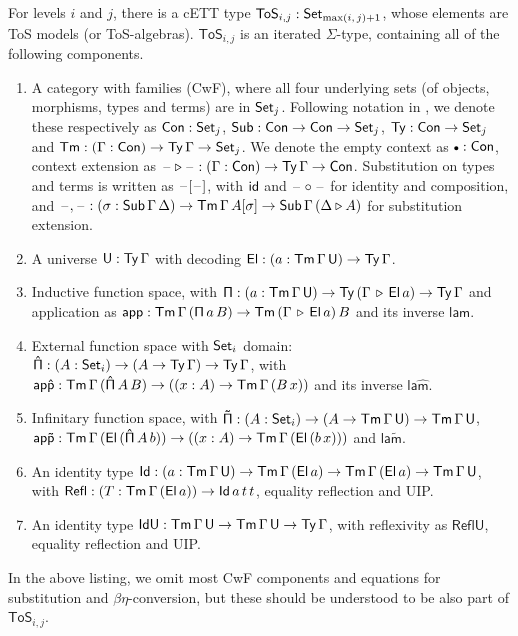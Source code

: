 \documentclass{llncs}
\newcommand{\ToS}{\mathsf{ToS}}
\newcommand{\ext}{\triangleright}
\newcommand{\emptycon}{\scaleobj{.75}\bullet}
\newcommand{\Pii}{\mathsf{\Pi}}
\newcommand{\appi}{\mathsf{app}}
\newcommand{\lami}{\mathsf{lam}}
\newcommand{\Pie}{\mathsf{\hat{\Pi}}}
\newcommand{\appe}{\mathsf{ap\hat{p}}}
\newcommand{\lame}{\mathsf{la\hat{m}}}
\newcommand{\Piinf}{\mathsf{\tilde{\Pi}}}
\newcommand{\appinf}{\mathsf{ap\tilde{p}}}
\newcommand{\laminf}{\mathsf{la\tilde{m}}}
\newcommand{\Refl}{\mathsf{Refl}}
\newcommand{\IdU}{\mathsf{IdU}}
\newcommand{\ReflU}{\mathsf{ReflU}}
\begin{document}
\begin{nidefinition}\label{def:tos}
For levels $i$ and $j$, there is a cETT type $\ToS_{i,j} : \Set_{\max(i,\,j)+1}$, whose elements are
ToS models (or ToS-algebras). $\ToS_{i,j}$ is an iterated $\Sigma$-type, containing
all of the following components.
\begin{enumerate}
\item
  A category with families (CwF), where all four underlying sets (of objects,
  morphisms, types and terms) are in $\mathsf{Set}_j$. Following notation in
  \cite{TODO}, we denote these respectively as $\mathsf{Con} : \mathsf{Set}_j$, $\mathsf{Sub} : \mathsf{Con} \rightarrow
  \mathsf{Con} \rightarrow \mathsf{Set}_j$, $\mathsf{Ty} : \mathsf{Con} \rightarrow \mathsf{Set}_j$ and $\mathsf{Tm} : (\Gamma : \mathsf{Con}) \rightarrow
  \mathsf{Ty}\,\Gamma \rightarrow \mathsf{Set}_j$. We denote the empty context as $\emptycon : \Con$,
  context extension as $\blank\ext\blank : (\Gamma : \Con)\ra \Ty\,\Gamma \ra
  \Con$.  Substitution on types and terms is written as $\mathord{\hspace{1pt}\text{--}\hspace{1pt}}[\mathord{\hspace{1pt}\text{--}\hspace{1pt}}]$, with
  $\mathsf{id}$ and $\mathord{\hspace{1pt}\text{--}\hspace{1pt}}\circ\mathord{\hspace{1pt}\text{--}\hspace{1pt}}$ for identity and composition, and $\blank,\blank
  : (\sigma : \Sub\,\Gamma\,\Delta)\ra \Tm\,\Gamma\,A[\sigma]\ra
  \Sub\,\Gamma\,(\Delta\ext A)$ for substitution extension.
\item
  A universe $\mathsf{U} : \mathsf{Ty}\,\Gamma$ with decoding $\mathsf{El} : (a : \mathsf{Tm}\,\Gamma\,\mathsf{U}) \rightarrow
  \mathsf{Ty}\,\Gamma$.
\item
  Inductive function space, with $\Pii : (a : \Tm\,\Gamma\,\U) \ra
  \Ty\,(\Gamma\,\ext\,\El\,a) \ra \Ty\,\Gamma$ and application as $\appi :
  \Tm\,\Gamma\,(\Pii\,a\,B)\ra \Tm\,(\Gamma\,\ext\,\El\,a)\,B$ and its
  inverse $\lami$.
\item
  External function space with $\mathsf{Set}_i$ domain: $\Pie : (A : \Set_i)\ra(A \ra
  \Ty\,\Gamma)\ra \Ty\,\Gamma$, with $\appe : \Tm\,\Gamma\,(\Pie\,A\,B)\ra((x :
  A)\ra \Tm\,\Gamma\,(B\,x))$ and its inverse $\lame$.
\item
  Infinitary function space, with $\Piinf : (A : \Set_i)\ra(A \ra
  \Tm\,\Gamma\,\U)\ra \Tm\,\Gamma\,\U$, $\appinf :
  \Tm\,\Gamma\,(\El\,(\Pie\,A\,b))\ra((x : A)\ra \Tm\,\Gamma\,(\El\,(b\,x)))$
  and $\laminf$.
\item
  An identity type $\mathsf{Id} : (a : \mathsf{Tm}\,\Gamma\,\mathsf{U})\rightarrow
  \mathsf{Tm}\,\Gamma\,(\mathsf{El}\,a)\rightarrow\mathsf{Tm}\,\Gamma\,(\mathsf{El}\,a)\rightarrow \mathsf{Tm}\,\Gamma\,\mathsf{U}$, with
  $\Refl : (T : \Tm\,\Gamma\,(\El\,a))\ra \Id\,a\,t\,t$, equality reflection
  and UIP.
\item
  An identity type $\IdU : \Tm\,\Gamma\,\U \ra \Tm\,\Gamma\,\U \ra \Ty\,\Gamma$,
  with reflexivity as $\ReflU$, equality reflection and UIP.
\end{enumerate}
\end{nidefinition}
In the above listing, we omit most CwF components and equations for substitution and
$\beta\eta$-conversion, but these should be understood to be also part of $\ToS_{i,j}$.
\end{document}
